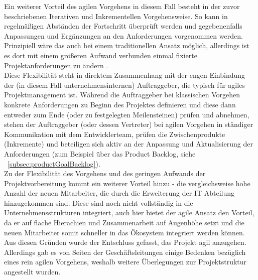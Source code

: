 Ein weiterer Vorteil des agilen Vorgehens in diesem Fall besteht in der zuvor beschriebenen Iterativen und Inkrementellen Vorgehensweise. So kann in regelmäßigen Abständen der Fortschritt überprüft werden und gegebenenfalls Anpassungen und Ergänzungen an den Anforderungen vorgenommen werden. Prinzipiell wäre das auch bei einem traditionellen Ansatz möglich, allerdings ist es dort mit einem größeren Aufwand verbunden einmal fixierte Projektanforderungen zu ändern .\\

Diese Flexibilität steht in direktem Zusammenhang mit der engen Einbindung der (in diesem Fall unternehmensinternen) Auftraggeber, die typisch für agiles Projektmanagement ist. Während die Auftraggeber bei klassischen Vorgehen konkrete Anforderungen zu Beginn des Projektes definieren und diese dann entweder zum Ende (oder zu festgelegten Meilensteinen) prüfen und abnehmen, stehen der Auftraggeber (oder dessen Vertreter) bei agilen Vorgehen in ständiger Kommunikation mit dem Entwicklerteam, prüfen die Zwischenprodukte (Inkremente) und beteiligen sich aktiv an der Anpassung und Aktualisierung der Anforderungen (zum Beispiel über das Product Backlog, siehe ~\ref{subsec:productGoalBacklog}).\\

Zu der Flexibilität des Vorgehens und des geringen Aufwands der Projektvorbereitung kommt ein weiterer Vorteil hinzu - die vergleichsweise hohe Anzahl der neuen Mitarbeiter, die durch die Erweiterung der IT Abteilung hinzugekommen sind. Diese sind noch nicht vollständig in die Unternehmensstrukturen integriert, auch hier bietet der agile Ansatz den Vorteil, da er auf flache Hierachien und Zusammenarbeit auf Augenhöhe setzt und die neuen Mitarbeiter somit schneller in das Ökosystem integriert werden können.\\

Aus diesen Gründen wurde der Entschluss gefasst, das Projekt agil anzugehen. Allerdings gab es von Seiten der Geschäftsleitungen einige Bedenken bezüglich eines rein agilen Vorgehens, weshalb weitere Überlegungen zur Projektstruktur angestellt wurden.\\